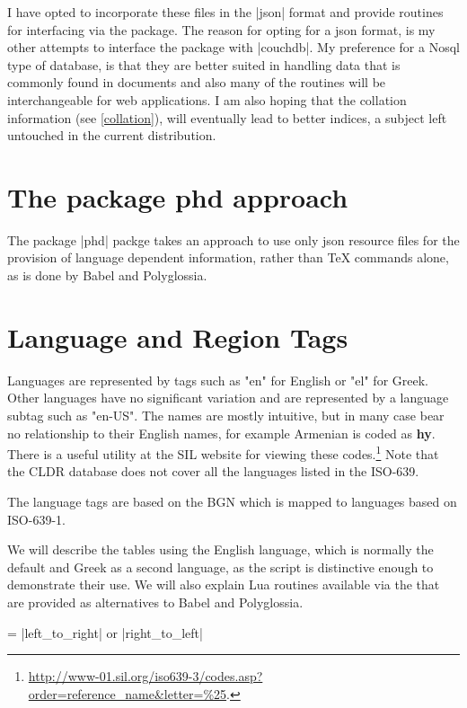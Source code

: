 I have opted to incorporate these files in the |json| format and provide routines for interfacing via the  package.  The reason for opting for a json format, is my other attempts to interface the package with |couchdb|.  My preference for a Nosql type of database, is that  they are better suited in handling data that is commonly  found in documents and also many of the routines will be interchangeable for web applications. I am also hoping that the collation information (see \ref{collation}), will eventually lead to better indices, a subject left untouched in the current distribution.

\section{The package phd approach}

The package |phd| packge takes an approach to use only json resource files for the provision of language dependent information, rather than TeX commands alone, as is done by Babel and Polyglossia. 

\section{Language and Region Tags}

Languages are represented by tags such as "en"  for English or "el" for Greek. Other languages have no significant variation and are represented by a language subtag such as "en-US".  The names are mostly intuitive, but in many case bear no relationship to their English names, for example Armenian is coded as \textbf{hy}. There is a useful utility at the SIL website for viewing these codes.\footnote{\protect\url{http://www-01.sil.org/iso639-3/codes.asp?order=reference_name&letter=\%25}.} Note that the CLDR database does not cover all the languages listed in the ISO-639.

The language tags are based on the BGN which is mapped to languages based on ISO-639-1. 

We will describe the tables using the English language, which is normally the default and Greek as a second language, as the script is distinctive enough to demonstrate their use. We will also explain Lua routines available via the  that are provided as alternatives to Babel and Polyglossia.



 = |left_to_right| or |right_to_left|

